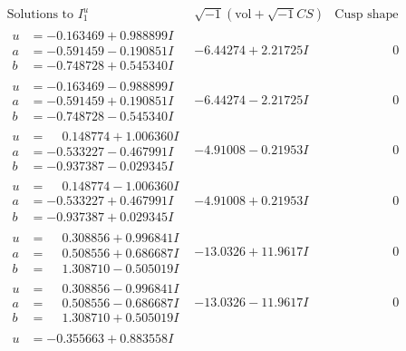 \documentclass[1p]{elsarticle_modified}
\theoremstyle{definition}
\newcommand{\I}{\sqrt{-1}}
\begin{document}
$$\begin{array}{c|c|c}  
\text{Solutions to }I^u_{1}& \I (\text{vol} + \sqrt{-1}CS) & \text{Cusp shape}\\
 \hline 
\begin{aligned}
u &= -0.163469 + 0.988899 I \\
a &= -0.591459 - 0.190851 I \\
b &= -0.748728 + 0.545340 I\end{aligned}
 & -6.44274 + 2.21725 I & \phantom{-0.000000 } 0 \\ \hline\begin{aligned}
u &= -0.163469 - 0.988899 I \\
a &= -0.591459 + 0.190851 I \\
b &= -0.748728 - 0.545340 I\end{aligned}
 & -6.44274 - 2.21725 I & \phantom{-0.000000 } 0 \\ \hline\begin{aligned}
u &= \phantom{-}0.148774 + 1.006360 I \\
a &= -0.533227 - 0.467991 I \\
b &= -0.937387 - 0.029345 I\end{aligned}
 & -4.91008 - 0.21953 I & \phantom{-0.000000 } 0 \\ \hline\begin{aligned}
u &= \phantom{-}0.148774 - 1.006360 I \\
a &= -0.533227 + 0.467991 I \\
b &= -0.937387 + 0.029345 I\end{aligned}
 & -4.91008 + 0.21953 I & \phantom{-0.000000 } 0 \\ \hline\begin{aligned}
u &= \phantom{-}0.308856 + 0.996841 I \\
a &= \phantom{-}0.508556 + 0.686687 I \\
b &= \phantom{-}1.308710 - 0.505019 I\end{aligned}
 & -13.0326 + 11.9617 I & \phantom{-0.000000 } 0 \\ \hline\begin{aligned}
u &= \phantom{-}0.308856 - 0.996841 I \\
a &= \phantom{-}0.508556 - 0.686687 I \\
b &= \phantom{-}1.308710 + 0.505019 I\end{aligned}
 & -13.0326 - 11.9617 I & \phantom{-0.000000 } 0 \\ \hline\begin{aligned}
u &= -0.355663 + 0.883558 I \\

\end{aligned}
\end{array}$$
\end{document}

